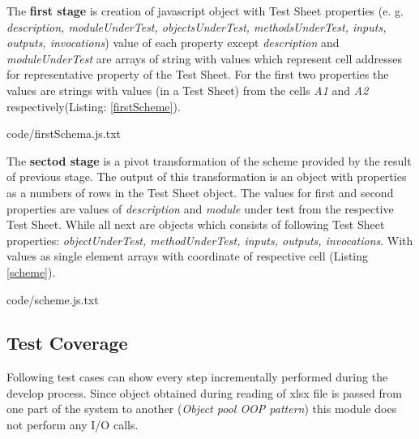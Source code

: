 The \textbf{first stage} is creation of javascript object with Test Sheet properties (e. g. \textit{description, moduleUnderTest, objectsUnderTest, methodsUnderTest, inputs, outputs, invocations}) value of each property except \textit{description} and \textit{moduleUnderTest} are arrays of string with values which represent cell addresses for representative property of the Test Sheet. For the first two properties the values are strings with values (in a Test Sheet) from the cells \textit{A1} and \textit{A2} respectively(Listing: \ref{firstScheme}).


{code/firstSchema.js.txt}

The \textbf{sectod stage} is a pivot transformation of the scheme provided by the result of previous stage. The output of this transformation is an object with properties as a numbers of rows in the Test Sheet object. The values for first and second properties are values of \textit{description} and \textit{module} under test from the respective Test Sheet. While all next are objects which consists of following Test Sheet properties: \textit{objectUnderTest, methodUnderTest, inputs, outputs, invocations}. With values as single element arrays with coordinate of respective cell (Listing \ref{scheme}).

{code/scheme.js.txt}

%
\subsection{Test Coverage}
Following test cases can show every step incrementally performed during the develop process. Since object obtained during reading of xlsx file is passed from one part of the system to another (\textit{Object pool OOP pattern}) this module does not perform any I/O calls.
%

